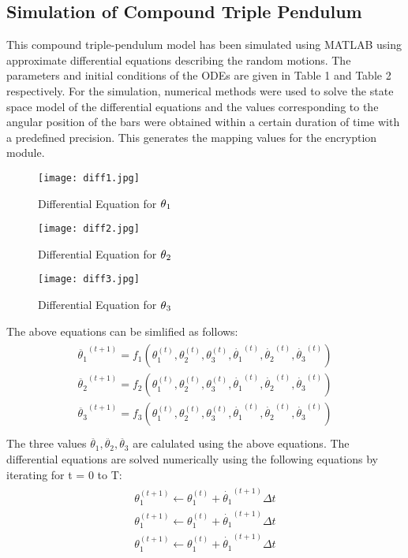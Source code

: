 \subsection{Simulation of Compound Triple Pendulum}
This compound triple-pendulum model has been simulated using MATLAB using approximate differential equations describing the random motions. The parameters and initial conditions of the ODEs are given in Table 1 and Table 2 respectively. For the simulation, numerical methods were used to solve the state space model of the differential equations and the values corresponding to the angular position of the bars were obtained within a certain duration of time with a predefined precision. This generates the mapping values for the encryption module.

\begin{figure}[H]
\centering
\texttt{[image: diff1.jpg]}
\caption{Differential Equation for ${\theta\textsubscript{1}}$}\label{fig:diff1}
\end{figure}


\begin{figure}[H]
\centering
\texttt{[image: diff2.jpg]}
\caption{Differential Equation for ${\theta\textsubscript{2}}$}\label{fig:diff2}
\end{figure}


\begin{figure}[H]
\centering
\texttt{[image: diff3.jpg]}
\caption{Differential Equation for ${\theta\textsubscript{3}}$}\label{fig:diff3}
\end{figure}
\vfill

The above equations can be simlified as follows:
\begin{align}
\begin{split}
\ddot{\theta_{1}}^{(t+1)} = f_{1}(\theta^{(t)}_{1}, \theta^{(t)}_{2}, \theta^{(t)}_{3},\dot{\theta_{1}}^{(t)},\dot{\theta_{2}}^{(t)}, \dot{\theta_{3}}^{(t)}) \\
\ddot{\theta_{2}}^{(t+1)} = f_{2}(\theta^{(t)}_{1}, \theta^{(t)}_{2}, \theta^{(t)}_{3},\dot{\theta_{1}}^{(t)},\dot{\theta_{2}}^{(t)}, \dot{\theta_{3}}^{(t)})\\
\ddot{\theta_{3}}^{(t+1)} = f_{3}(\theta^{(t)}_{1}, \theta^{(t)}_{2}, \theta^{(t)}_{3},\dot{\theta_{1}}^{(t)},\dot{\theta_{2}}^{(t)}, \dot{\theta_{3}}^{(t)})\\  
\end{split}
\end{align}
The three values $\ddot{\theta_{1}},\ddot{\theta_{2}},\ddot{\theta_{3}}$ are calulated using the above equations.
The differential equations are solved numerically using the following equations by iterating for t = 0 to T:
\begin{align}
\begin{split}
\theta^{(t+1)}_{1} \leftarrow \theta^{(t)}_{1} + \dot{\theta_{1}}^{(t+1)}\Delta t \\
\theta^{(t+1)}_{1} \leftarrow \theta^{(t)}_{1} + \dot{\theta_{1}}^{(t+1)}\Delta t \\
\theta^{(t+1)}_{1} \leftarrow \theta^{(t)}_{1} + \dot{\theta_{1}}^{(t+1)}\Delta t \\  
\end{split}
\end{align}

